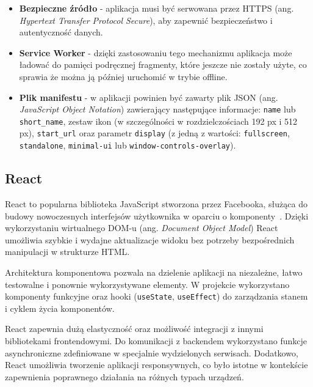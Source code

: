 \begin{itemize}

  \item \textbf{Bezpieczne źródło} - aplikacja musi być serwowana przez HTTPS (ang. \textit{Hypertext Transfer Protocol Secure}), aby zapewnić bezpieczeństwo i autentyczność danych.

  \item \textbf{Service Worker} - dzięki zastosowaniu tego mechanizmu aplikacja może ładować do pamięci podręcznej fragmenty, które jeszcze nie zostały użyte, co sprawia że można ją później uruchomić w trybie offline.

  \item \textbf{Plik manifestu} - w aplikacji powinien być zawarty plik JSON (ang. \textit{JavaScript Object Notation}) zawierający następujące informacje: \texttt{name} lub \texttt{short\_name}, zestaw ikon (w szczególności w rozdzielczościach 192 px i 512 px), \texttt{start\_url} oraz parametr \texttt{display} (z jedną z wartości: \texttt{fullscreen}, \texttt{standalone}, \texttt{minimal-ui} lub \texttt{window-controls-overlay}).

\end{itemize}

\subsection{React}

React to popularna biblioteka JavaScript stworzona przez Facebooka, służąca do budowy nowoczesnych interfejsów użytkownika w oparciu o komponenty~\cite{react-docs}. Dzięki wykorzystaniu wirtualnego DOM-u (ang. \textit{Document Object Model}) React umożliwia szybkie i wydajne aktualizacje widoku bez potrzeby bezpośrednich manipulacji w strukturze HTML.

Architektura komponentowa pozwala na dzielenie aplikacji na niezależne, łatwo testowalne i ponownie wykorzystywane elementy. W projekcie wykorzystano komponenty funkcyjne oraz hooki (\texttt{useState}, \texttt{useEffect}) do zarządzania stanem i cyklem życia komponentów.

React zapewnia dużą elastyczność oraz możliwość integracji z innymi bibliotekami frontendowymi. Do komunikacji z backendem wykorzystano funkcje asynchroniczne zdefiniowane w specjalnie wydzielonych serwisach. Dodatkowo, React umożliwia tworzenie aplikacji responsywnych, co było istotne w kontekście zapewnienia poprawnego działania na różnych typach urządzeń.

